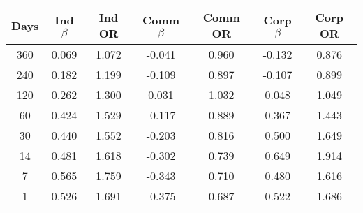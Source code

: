 \begin{tabular}{||c c c c c c c ||}
\hline
Days & Ind $\beta$ & Ind OR & Comm $\beta$ & Comm OR & Corp $\beta$ & Corp OR \\
\hline\hline
360 & 0.069 & 1.072 & -0.041 & 0.960 & -0.132 & 0.876 \\
240 & 0.182 & 1.199 & -0.109 & 0.897 & -0.107 & 0.899 \\
120 & 0.262 & 1.300 & 0.031 & 1.032 & 0.048 & 1.049 \\
60 & 0.424 & 1.529 & -0.117 & 0.889 & 0.367 & 1.443 \\
30 & 0.440 & 1.552 & -0.203 & 0.816 & 0.500 & 1.649 \\
14 & 0.481 & 1.618 & -0.302 & 0.739 & 0.649 & 1.914 \\
7 & 0.565 & 1.759 & -0.343 & 0.710 & 0.480 & 1.616 \\
1 & 0.526 & 1.691 & -0.375 & 0.687 & 0.522 & 1.686 \\
\hline
\end{tabular}
